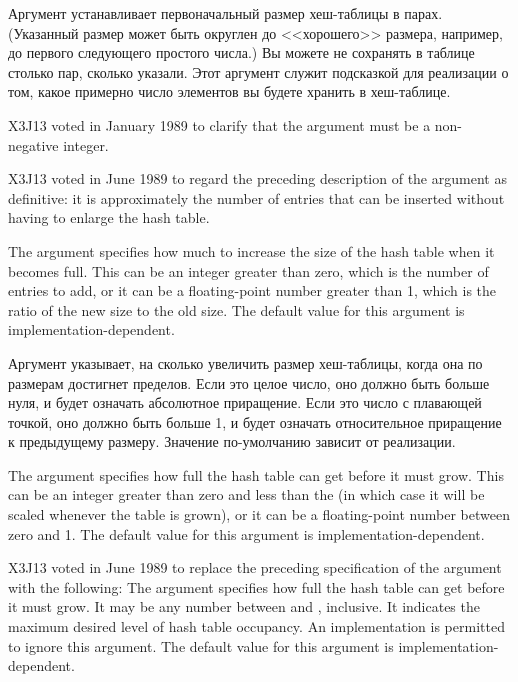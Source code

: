 \begin{defun}[Function]
Аргумент  устанавливает первоначальный размер хеш-таблицы в парах.
(Указанный размер может быть округлен до <<хорошего>> размера, например, до
первого следующего простого числа.)
Вы можете не сохранять в таблице столько пар, сколько указали. Этот аргумент
служит подсказкой для реализации о том, какое примерно число элементов вы будете
хранить в хеш-таблице.

\begin{new}
X3J13 voted in January 1989
to clarify that the  argument
must be a non-negative integer.
\end{new}

\begin{newer}
X3J13 voted in June 1989  to regard the
preceding description of the  argument as definitive: it
is approximately the number of entries that can be inserted
without having to enlarge the hash table.
\end{newer}

The  argument
specifies how much to increase the size of the hash table when it becomes
full.  This can be an integer greater than zero,
which is the number of entries to add, or
it can be a floating-point number greater than 1,
which is the ratio of the new size to the old size.
The default value for this argument is implementation-dependent.

Аргумент  указывает, на сколько увеличить размер хеш-таблицы,
когда она по размерам достигнет пределов.
Если это целое число, оно должно быть больше нуля, и будет означать абсолютное
приращение. Если это число с плавающей точкой, оно должно быть больше 1, и будет
означать относительное приращение к предыдущему размеру.
Значение по-умолчанию зависит от реализации.

\begin{obsolete}
The  argument
specifies how full the hash table can get before it must grow.
This can be an integer greater than zero and less than the 
(in which case it will be scaled whenever the table is grown),
or it can be a floating-point number between zero and 1.
The default value for this argument is implementation-dependent.
\end{obsolete}

\begin{newer}
X3J13 voted in June 1989  to replace
the preceding specification of the  argument
with the following:
The  argument
specifies how full the hash table can get before it must grow.
It may be any  number between  and , inclusive.
It indicates the maximum desired level of hash table occupancy.
An implementation is permitted to ignore this argument.
The default value for this argument is implementation-dependent.


\end{newer}
\end{defun}
